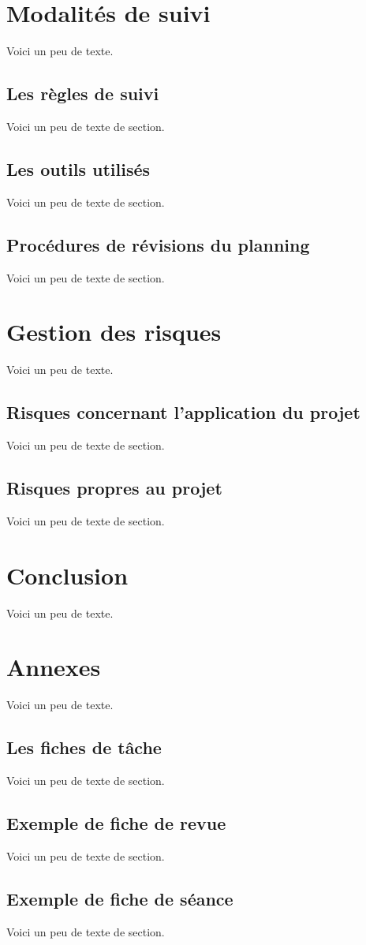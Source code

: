     \section{Modalités de suivi}
    Voici un peu de texte.
    \subsection{Les règles de suivi}
    Voici un peu de texte de section.
    \subsection{Les outils utilisés}
    Voici un peu de texte de section.
    \subsection{Procédures de révisions du planning}
    Voici un peu de texte de section.
    
    \section{Gestion des risques}
    Voici un peu de texte.
    \subsection{Risques concernant l'application du projet}
    Voici un peu de texte de section.
    \subsection{Risques propres au projet}
    Voici un peu de texte de section.
    
    \section{Conclusion}
    Voici un peu de texte.
    
    \section{Annexes}
    Voici un peu de texte.
    \subsection{Les fiches de tâche}
    Voici un peu de texte de section.
    \subsection{Exemple de fiche de revue}
    Voici un peu de texte de section.
    \subsection{Exemple de fiche de séance}
    Voici un peu de texte de section.
